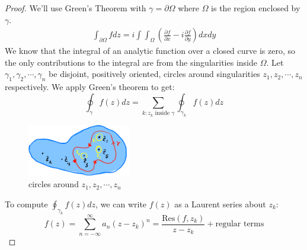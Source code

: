 \begin{proof}
    We'll use Green's Theorem with $\gamma = \partial \Omega$ where $\Omega$ is the region enclosed by $\gamma$.
    \begin{align*}
        \int_{\partial \Omega} f dz = i \int\int_{\Omega} \left( \frac{\partial f}{\partial x} - i\frac{\partial f}{\partial y} \right) dxdy
    \end{align*}
    We know that the integral of an analytic function over a closed curve is zero, so the only contributions to the integral are from the singularities inside $\Omega$. Let $\gamma_1, \gamma_2, \cdots, \gamma_n$ be disjoint, positively oriented, circles around singularities $z_1, z_2, \cdots, z_n$ respectively. We apply Green's theorem to get:
    \begin{equation*}
        \oint_{\gamma} f(z) dz = \sum_{k : z_k \text{ inside } \gamma} \oint_{\gamma_k} f(z) dz
    \end{equation*}
    \begin{figure}[H]
        \centering
        \includegraphics[width=0.4\textwidth]{LECTURE_11/residues-2.png}
        \caption{circles around $z_1, z_2, \cdots, z_n$}
        \label{fig:residue-2}
    \end{figure}

    To compute $\oint_{\gamma_k} f(z) dz$, we can write $f(z)$ as a Laurent series about $z_k$:
    \begin{equation}
        f(z) = \sum_{n = -\infty}^{\infty} a_n (z - z_k)^n = \frac{\text{Res}(f, z_k)}{z - z_k} + \text{regular terms}
    \end{equation}


\end{proof}
